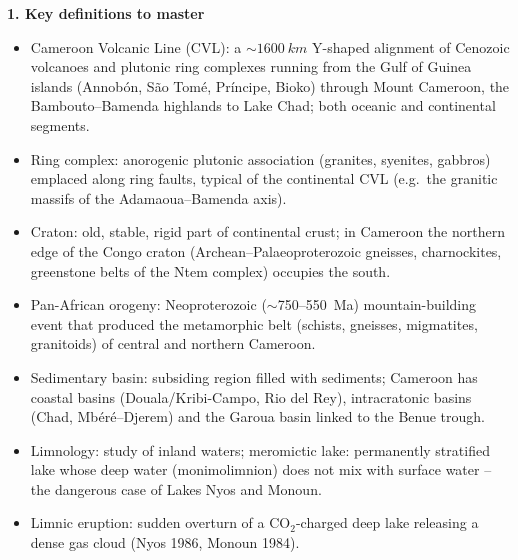 \documentclass[11pt]{article}
\newcommand{\cle}[1]{{\popxbold\color{popdark}#1}}
\begin{document}
\begin{bilan}
\textbf{1. Key definitions to master}
\begin{itemize}
\item \cle{Cameroon Volcanic Line (CVL)}: a $\sim\SI{1600}{km}$ Y-shaped alignment of Cenozoic volcanoes and plutonic ring complexes running from the Gulf of Guinea islands (Annob\'on, S\~ao Tom\'e, Pr\'incipe, Bioko) through Mount Cameroon, the Bambouto--Bamenda highlands to Lake Chad; both oceanic and continental segments.
\item \cle{Ring complex}: anorogenic plutonic association (granites, syenites, gabbros) emplaced along ring faults, typical of the continental CVL (e.g.\ the granitic massifs of the Adamaoua--Bamenda axis).
\item \cle{Craton}: old, stable, rigid part of continental crust; in Cameroon the northern edge of the \cle{Congo craton} (Archean--Palaeoproterozoic gneisses, charnockites, greenstone belts of the Ntem complex) occupies the south.
\item \cle{Pan-African orogeny}: Neoproterozoic ($\sim$750--550~Ma) mountain-building event that produced the metamorphic belt (schists, gneisses, migmatites, granitoids) of central and northern Cameroon.
\item \cle{Sedimentary basin}: subsiding region filled with sediments; Cameroon has coastal basins (Douala/Kribi-Campo, Rio del Rey), intracratonic basins (Chad, Mb\'er\'e--Djerem) and the Garoua basin linked to the \cle{Benue trough}.
\item \cle{Limnology}: study of inland waters; \cle{meromictic lake}: permanently stratified lake whose deep water (monimolimnion) does not mix with surface water -- the dangerous case of Lakes Nyos and Monoun.
\item \cle{Limnic eruption}: sudden overturn of a CO$_2$-charged deep lake releasing a dense gas cloud (Nyos 1986, Monoun 1984).
\end{itemize}


\end{bilan}
\end{document}
